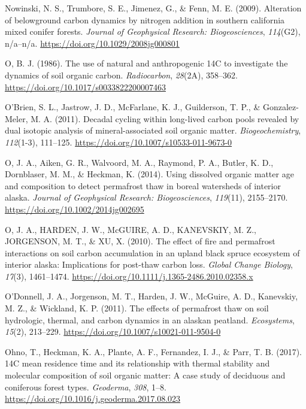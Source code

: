 \documentclass[]{article}
\begin{document}
\leavevmode\hypertarget{ref-Nowinski_2009}{}%
Nowinski, N. S., Trumbore, S. E., Jimenez, G., \& Fenn, M. E. (2009).
Alteration of belowground carbon dynamics by nitrogen addition in
southern california mixed conifer forests. \emph{Journal of Geophysical
Research: Biogeosciences}, \emph{114}(G2), n/a--n/a.
\url{https://doi.org/10.1029/2008jg000801}

\leavevmode\hypertarget{ref-O_Brien_1986}{}%
O\textquotesingleBrien, B. J. (1986). The use of natural and
anthropogenic 14C to investigate the dynamics of soil organic carbon.
\emph{Radiocarbon}, \emph{28}(2A), 358--362.
\url{https://doi.org/10.1017/s0033822200007463}

\leavevmode\hypertarget{ref-O_Brien_2011}{}%
O'Brien, S. L., Jastrow, J. D., McFarlane, K. J., Guilderson, T. P., \&
Gonzalez-Meler, M. A. (2011). Decadal cycling within long-lived carbon
pools revealed by dual isotopic analysis of mineral-associated soil
organic matter. \emph{Biogeochemistry}, \emph{112}(1-3), 111--125.
\url{https://doi.org/10.1007/s10533-011-9673-0}

\leavevmode\hypertarget{ref-O_Donnell_2014}{}%
O\textquotesingleDonnell, J. A., Aiken, G. R., Walvoord, M. A., Raymond,
P. A., Butler, K. D., Dornblaser, M. M., \& Heckman, K. (2014). Using
dissolved organic matter age and composition to detect permafrost thaw
in boreal watersheds of interior alaska. \emph{Journal of Geophysical
Research: Biogeosciences}, \emph{119}(11), 2155--2170.
\url{https://doi.org/10.1002/2014jg002695}

\leavevmode\hypertarget{ref-O_DONNELL_2010}{}%
O\textquotesingleDONNELL, J. A., HARDEN, J. W., McGUIRE, A. D.,
KANEVSKIY, M. Z., JORGENSON, M. T., \& XU, X. (2010). The effect of fire
and permafrost interactions on soil carbon accumulation in an upland
black spruce ecosystem of interior alaska: Implications for post-thaw
carbon loss. \emph{Global Change Biology}, \emph{17}(3), 1461--1474.
\url{https://doi.org/10.1111/j.1365-2486.2010.02358.x}

\leavevmode\hypertarget{ref-O_Donnell_2011}{}%
O'Donnell, J. A., Jorgenson, M. T., Harden, J. W., McGuire, A. D.,
Kanevskiy, M. Z., \& Wickland, K. P. (2011). The effects of permafrost
thaw on soil hydrologic, thermal, and carbon dynamics in an alaskan
peatland. \emph{Ecosystems}, \emph{15}(2), 213--229.
\url{https://doi.org/10.1007/s10021-011-9504-0}

\leavevmode\hypertarget{ref-Ohno_2017}{}%
Ohno, T., Heckman, K. A., Plante, A. F., Fernandez, I. J., \& Parr, T.
B. (2017). 14C mean residence time and its relationship with thermal
stability and molecular composition of soil organic matter: A case study
of deciduous and coniferous forest types. \emph{Geoderma}, \emph{308},
1--8. \url{https://doi.org/10.1016/j.geoderma.2017.08.023}
\end{document}
